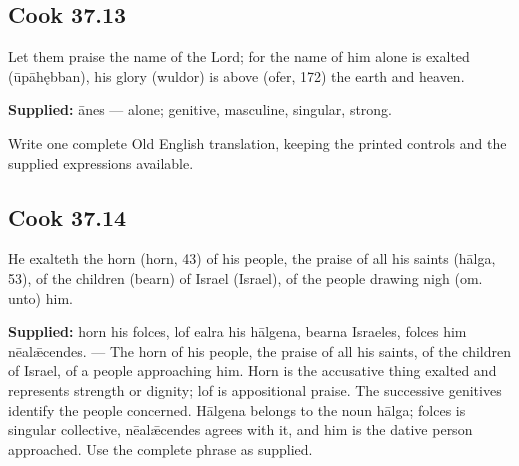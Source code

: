 \par\begin{minipage}{\linewidth}\raggedright
\subsection*{Cook 37.13}

Let them praise the name of the Lord; for the name of him alone is exalted (ūpāhębban), his glory (wuldor) is above (ofer, 172) the earth and heaven.

\textbf{Supplied:} ānes — alone; genitive, masculine, singular, strong.

Write one complete Old English translation, keeping the printed controls and the supplied expressions available.

\end{minipage}\par\addvspace{4pt}

\par\begin{minipage}{\linewidth}\raggedright
\subsection*{Cook 37.14}

He exalteth the horn (horn, 43) of his people, the praise of all his saints (hālga, 53), of the children (bearn) of Israel (Israel), of the people drawing nigh (om. unto) him.

\end{minipage}\par\addvspace{4pt}

\textbf{Supplied:} horn his folces, lof ealra his hālgena, bearna Israeles, folces him nēalǣcendes. — The horn of his people, the praise of all his saints, of the children of Israel, of a people approaching him. Horn is the accusative thing exalted and represents strength or dignity; lof is appositional praise. The successive genitives identify the people concerned. Hālgena belongs to the noun hālga; folces is singular collective, nēalǣcendes agrees with it, and him is the dative person approached. Use the complete phrase as supplied.

